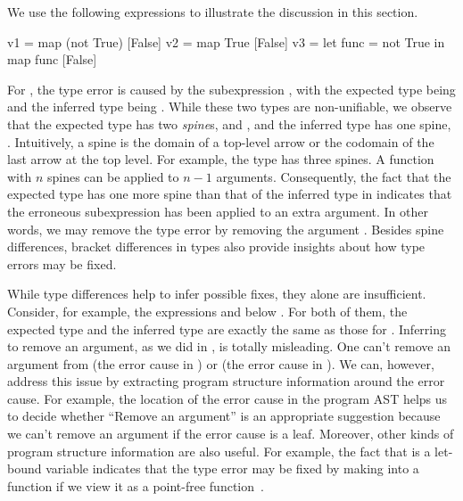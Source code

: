 \documentclass[12pt]{report}	%
\begin{document}
We use the following expressions to illustrate the discussion in
this section.
%
\begin{program}
v1 = map (not True) [False]   
v2 = map True [False]   
v3 = let func = not True 
     in map func [False]
\end{program}
%
For , the type error is caused by the subexpression ,
with the expected type being  and the inferred type being \Bool.
While these two types are non-unifiable, we observe that the expected type
has two \emph{spine}s,  and , and the inferred type has one
spine, \Bool. Intuitively, a spine is the domain of a top-level
arrow or the codomain of the last arrow at the top level. For example,
the type  has three spines. A function with $n$
spines can be applied to $n-1$ arguments. Consequently, the fact that the
expected type has one more spine than that of the inferred type in 
indicates that the 
erroneous subexpression has been applied to 
an extra argument.
In other words, we may remove the type error by removing the
argument . Besides spine differences, bracket differences in
types also provide insights about how type errors may be fixed.

While type differences help to infer possible fixes, they alone
are insufficient. Consider, for example, the expressions 
and  below . For both of them, the
expected type and the inferred type are exactly the same as those
for . Inferring to remove an argument, as we did in ,
is totally misleading. One can't remove an argument from 
(the error cause in ) or  (the error cause
in ). We can, however, address this issue by extracting
program structure information around the error cause.
For example, the location of the error cause in the program
AST helps us to decide whether ``Remove an argument'' is an appropriate
suggestion because we can't remove an argument if the error cause is a leaf.
Moreover, other kinds of program structure information
are also useful. For example, the fact that  is a let-bound
variable indicates that the type error may be fixed by making
 into a function if we view it as a 
point-free function~\cite{jones2003haskell}.
\end{document}
